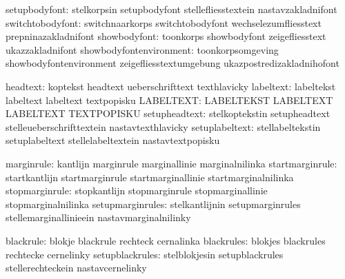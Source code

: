                 setupbodyfont:  stelkorpsin                  setupbodyfont
                                stellefliesstextein          nastavzakladnifont
             switchtobodyfont:  switchnaarkorps              switchtobodyfont
                                wechselezumfliesstext        prepninazakladnifont
                 showbodyfont:  toonkorps                    showbodyfont
                                zeigefliesstext              ukazzakladnifont
      showbodyfontenvironment:  toonkorpsomgeving            showbodyfontenvironment
                                zeigefliesstextumgebung      ukazpostredizakladnihofont

                     headtext:  koptekst                     headtext
                                ueberschrifttext             texthlavicky
                    labeltext:  labeltekst                   labeltext
                                labeltext                    textpopisku
                    LABELTEXT:  LABELTEKST                   LABELTEXT
                                LABELTEXT                    TEXTPOPISKU
                setupheadtext:  stelkoptekstin               setupheadtext
                                stelleueberschrifttextein    nastavtexthlavicky
               setuplabeltext:  stellabeltekstin             setuplabeltext
                                stellelabeltextein           nastavtextpopisku

                   marginrule:  kantlijn                     marginrule
                                marginallinie                marginalnilinka
              startmarginrule:  startkantlijn                startmarginrule
                                startmarginallinie           startmarginalnilinka
               stopmarginrule:  stopkantlijn                 stopmarginrule
                                stopmarginallinie            stopmarginalnilinka
             setupmarginrules:  stelkantlijnin               setupmarginrules
                                stellemarginallinieein       nastavmarginalnilinky

                    blackrule:  blokje                       blackrule
                                rechteck                     cernalinka
                   blackrules:  blokjes                      blackrules
                                rechtecke                    cernelinky
              setupblackrules:  stelblokjesin                setupblackrules
                                stellerechteckein            nastavcernelinky

